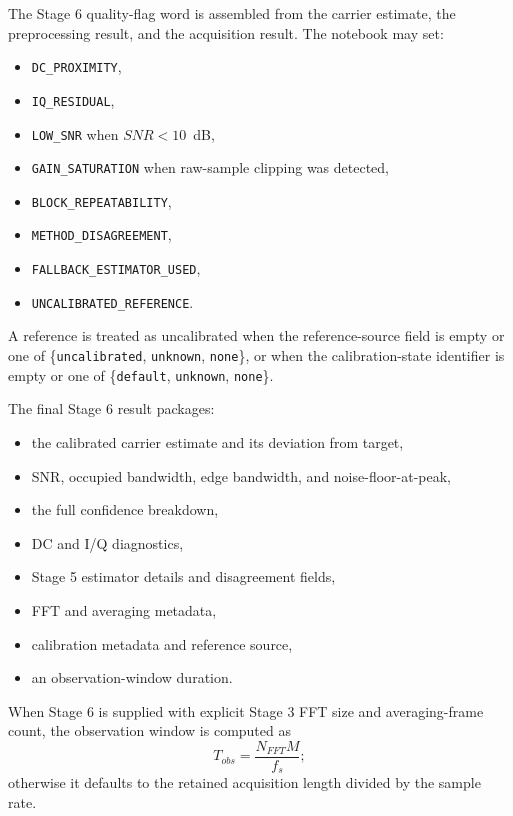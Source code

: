 \documentclass[11pt]{article}
\begin{document}
The Stage 6 quality-flag word is assembled from the carrier estimate, the preprocessing result, and the acquisition result. The notebook may set:
\begin{itemize}
    \item \texttt{DC\_PROXIMITY},
    \item \texttt{IQ\_RESIDUAL},
    \item \texttt{LOW\_SNR} when $SNR < 10$~dB,
    \item \texttt{GAIN\_SATURATION} when raw-sample clipping was detected,
    \item \texttt{BLOCK\_REPEATABILITY},
    \item \texttt{METHOD\_DISAGREEMENT},
    \item \texttt{FALLBACK\_ESTIMATOR\_USED},
    \item \texttt{UNCALIBRATED\_REFERENCE}.
\end{itemize}

A reference is treated as uncalibrated when the reference-source field is empty or one of \{\texttt{uncalibrated}, \texttt{unknown}, \texttt{none}\}, or when the calibration-state identifier is empty or one of \{\texttt{default}, \texttt{unknown}, \texttt{none}\}.

The final Stage 6 result packages:
\begin{itemize}
    \item the calibrated carrier estimate and its deviation from target,
    \item SNR, occupied bandwidth, edge bandwidth, and noise-floor-at-peak,
    \item the full confidence breakdown,
    \item DC and I/Q diagnostics,
    \item Stage 5 estimator details and disagreement fields,
    \item FFT and averaging metadata,
    \item calibration metadata and reference source,
    \item an observation-window duration.
\end{itemize}

When Stage 6 is supplied with explicit Stage 3 FFT size and averaging-frame count, the observation window is computed as
\begin{equation}
T_{obs} = \frac{N_{FFT} M}{f_s};
\end{equation}
otherwise it defaults to the retained acquisition length divided by the sample rate.
\end{document}
